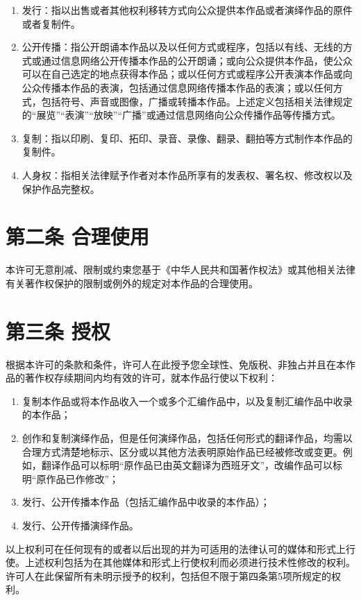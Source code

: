 \documentclass{book}
\begin{document}
\begin{enumerate}
	\item 发行：指以出售或者其他权利移转方式向公众提供本作品或者演绎作品的原件或者复制件。
	\item 公开传播：指公开朗诵本作品以及以任何方式或程序，包括以有线、无线的方式或通过信息网络公开传播本作品的公开朗诵；或向公众提供本作品，使公众可以在自己选定的地点获得本作品；或以任何方式或程序公开表演本作品或向公众传播本作品的表演，包括通过信息网络传播本作品的表演；或以任何方式，包括符号、声音或图像，广播或转播本作品。上述定义包括相关法律规定的“展览”“表演”“放映”“广播”或通过信息网络向公众传播作品等传播方式。
	\item 复制：指以印刷、复印、拓印、录音、录像、翻录、翻拍等方式制作本作品的复制件。
	\item 人身权：指相关法律赋予作者对本作品所享有的发表权、署名权、修改权以及保护作品完整权。
\end{enumerate}
\section{第二条 合理使用}
本许可无意削减、限制或约束您基于《中华人民共和国著作权法》或其他相关法律有关著作权保护的限制或例外的规定对本作品的合理使用。
\section{第三条 授权}
根据本许可的条款和条件，许可人在此授予您全球性、免版税、非独占并且在本作品的著作权存续期间内均有效的许可，就本作品行使以下权利：
\begin{enumerate}
	\item 复制本作品或将本作品收入一个或多个汇编作品中，以及复制汇编作品中收录的本作品；
	\item 创作和复制演绎作品，但是任何演绎作品，包括任何形式的翻译作品，均需以合理方式清楚地标示、区分或以其他方法表明原始作品已经被修改或变更。例如，翻译作品可以标明“原作品已由英文翻译为西班牙文”，改编作品可以标明“原作品已作修改”；
	\item 发行、公开传播本作品（包括汇编作品中收录的本作品）； 
	\item 发行、公开传播演绎作品。
\end{enumerate}
以上权利可在任何现有的或者以后出现的并为可适用的法律认可的媒体和形式上行使。上述权利包括为在其他媒体和形式上行使权利而必须进行技术性修改的权利。许可人在此保留所有未明示授予的权利，包括但不限于第四条第5项所规定的权利。
\end{document}
